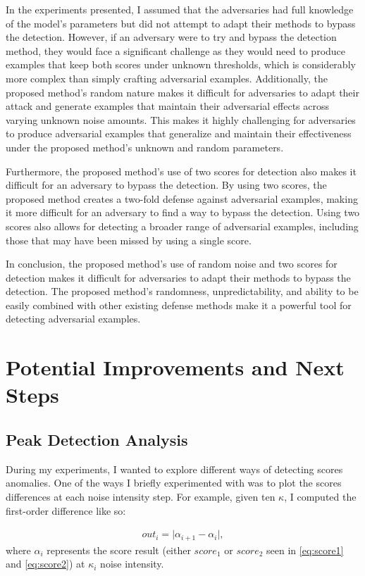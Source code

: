 In the experiments presented, I assumed that the adversaries had full knowledge
of the model's parameters but did not attempt to adapt their methods to bypass
the detection. However, if an adversary were to try and bypass the detection
method, they would face a significant challenge as they would need to produce
examples that keep both scores under unknown thresholds, which is considerably
more complex than simply crafting adversarial examples. Additionally, the
proposed method's random nature makes it difficult for adversaries to adapt
their attack and generate examples that maintain their adversarial effects
across varying unknown noise amounts. This makes it highly challenging for
adversaries to produce adversarial examples that generalize and maintain their
effectiveness under the proposed method's unknown and random parameters.

Furthermore, the proposed method's use of two scores for detection also makes it
difficult for an adversary to bypass the detection. By using two scores, the
proposed method creates a two-fold defense against adversarial examples, making
it more difficult for an adversary to find a way to bypass the detection. Using
two scores also allows for detecting a broader range of adversarial examples,
including those that may have been missed by using a single score.

In conclusion, the proposed method's use of random noise and two scores for
detection makes it difficult for adversaries to adapt their methods to bypass
the detection. The proposed method's randomness, unpredictability, and ability
to be easily combined with other existing defense methods make it a powerful
tool for detecting adversarial examples.


\clearpage
\section{Potential Improvements and Next Steps}

\subsection{Peak Detection Analysis}
During my experiments, I wanted to explore different ways of detecting scores
anomalies. One of the ways I briefly experimented with was to plot the scores
differences at each noise intensity step. For example, given ten $\kappa$, I
computed the first-order difference like so:

\begin{align}
    \label{eq:first-order-diff}
    out_i= \lvert \alpha_{i+1} - \alpha_{i} \rvert,
\end{align}
where $\alpha_i$ represents the score result (either $score_1$ or $score_2$ seen
in \ref{eq:score1} and \ref{eq:score2}) at $\kappa_i$ noise intensity.

